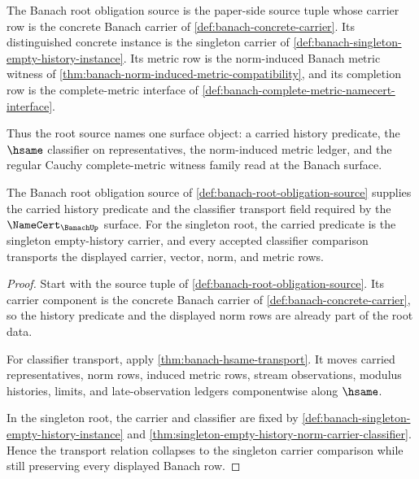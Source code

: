 \begin{definition}
\label{def:banach-root-obligation-source}
The Banach root obligation source is the paper-side source tuple whose carrier
row is the concrete Banach carrier of \autoref{def:banach-concrete-carrier}.
Its distinguished concrete instance is the singleton carrier of
\autoref{def:banach-singleton-empty-history-instance}. Its metric row is the
norm-induced Banach metric witness of
\autoref{thm:banach-norm-induced-metric-compatibility}, and its completion row
is the complete-metric interface of
\autoref{def:banach-complete-metric-namecert-interface}.

Thus the root source names one surface object: a carried history predicate, the
$\hsame$ classifier on representatives, the norm-induced metric ledger, and
the regular Cauchy complete-metric witness family read at the Banach surface.
\end{definition}

\begin{theorem}
\label{thm:banach-root-carrier-classifier-obligation}
The Banach root obligation source of
\autoref{def:banach-root-obligation-source} supplies the carried history
predicate and the classifier transport field required by the
$\NameCert_{\BanachUp}$ surface. For the singleton root, the carried predicate
is the singleton empty-history carrier, and every accepted classifier
comparison transports the displayed carrier, vector, norm, and metric rows.
\end{theorem}
\begin{proof}
Start with the source tuple of
\autoref{def:banach-root-obligation-source}. Its carrier component is the
concrete Banach carrier of \autoref{def:banach-concrete-carrier}, so the
history predicate and the displayed norm rows are already part of the root
data.

For classifier transport, apply
\autoref{thm:banach-hsame-transport}. It moves carried representatives, norm
rows, induced metric rows, stream observations, modulus histories, limits, and
late-observation ledgers componentwise along $\hsame$.

In the singleton root, the carrier and classifier are fixed by
\autoref{def:banach-singleton-empty-history-instance} and
\autoref{thm:singleton-empty-history-norm-carrier-classifier}. Hence the
transport relation collapses to the singleton carrier comparison while still
preserving every displayed Banach row.
\end{proof}


